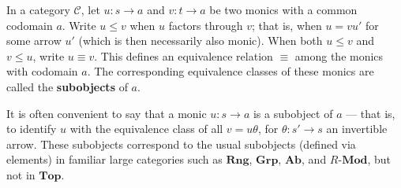 In a category $\mathcal{C}$, let $u : s \to a$ and $v : t \to a$ be two monics with a common codomain $a$. Write $u \leq v$ when $u$ factors through $v$; that is, when $u = v u'$ for some arrow $u'$ (which is then necessarily also monic). When both $u \leq v$ and $v \leq u$, write $u \equiv v$. This defines an equivalence relation $\equiv$ among the monics with codomain $a$. The corresponding equivalence classes of these monics are called the \textbf{subobjects} of $a$.

It is often convenient to say that a monic $u : s \to a$ is a subobject of $a$ --- that is, to identify $u$ with the equivalence class of all $v = u \theta$, for $\theta : s' \to s$ an invertible arrow. These subobjects correspond to the usual subobjects (defined via elements) in familiar large categories such as $\mathbf{Rng}$, $\mathbf{Grp}$, $\mathbf{Ab}$, and $R\text{-}\mathbf{Mod}$, but not in $\mathbf{Top}$.
